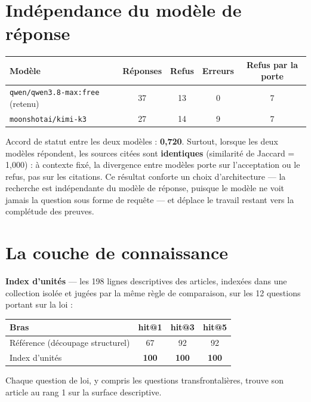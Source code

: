 \documentclass[a4paper,12pt]{report}
\begin{document}
\section{Indépendance du modèle de réponse}
\begin{table}[H]
\centering
\small
\begin{tabular}{lcccc}
\toprule
\textbf{Modèle} & \textbf{Réponses} & \textbf{Refus} & \textbf{Erreurs} & \textbf{Refus par la porte} \\
\midrule
\texttt{qwen/qwen3.8-max:free} (retenu) & 37 & 13 & 0 & 7 \\
\texttt{moonshotai/kimi-k3} & 27 & 14 & 9 & 7 \\
\bottomrule
\end{tabular}
\end{table}

Accord de statut entre les deux modèles : \textbf{0,720}. Surtout, lorsque les deux modèles
répondent, les sources citées sont \textbf{identiques} (similarité de Jaccard = 1,000) : à contexte
fixé, la divergence entre modèles porte sur l'acceptation ou le refus, pas sur les citations. Ce
résultat conforte un choix d'architecture — la recherche est indépendante du modèle de réponse,
puisque le modèle ne voit jamais la question sous forme de requête — et déplace le travail restant
vers la complétude des preuves.

\section{La couche de connaissance}
\textbf{Index d'unités} — les 198 lignes descriptives des articles, indexées dans une collection
isolée et jugées par la même règle de comparaison, sur les 12 questions portant sur la loi :

\begin{table}[H]
\centering
\begin{tabular}{lccc}
\toprule
\textbf{Bras} & \textbf{hit@1} & \textbf{hit@3} & \textbf{hit@5} \\
\midrule
Référence (découpage structurel) & 67 & 92 & 92 \\
Index d'unités & \textbf{100} & \textbf{100} & \textbf{100} \\
\bottomrule
\end{tabular}
\end{table}

Chaque question de loi, y compris les questions transfrontalières, trouve son article au rang 1 sur
la surface descriptive.
\end{document}
